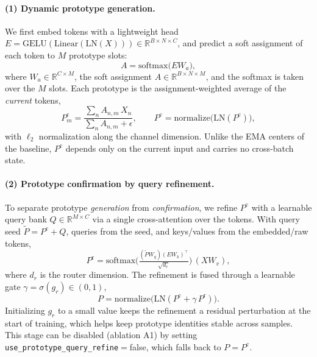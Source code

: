 \paragraph{(1) Dynamic prototype generation.}
We first embed tokens with a lightweight head
$E = \mathrm{GELU}(\mathrm{Linear}(\mathrm{LN}(X)))\in\mathbb{R}^{B\times N\times C}$,
and predict a soft assignment of each token to $M$ prototype slots:
\begin{equation}
A = \mathrm{softmax}\big(E W_a\big),
\label{eq:assign}
\end{equation}
where $W_a\in\mathbb{R}^{C\times M}$, the soft assignment
$A\in\mathbb{R}^{B\times N\times M}$, and the softmax is taken over the $M$ slots. Each prototype is the
assignment-weighted average of the \emph{current} tokens,
\begin{equation}
P^{\mathrm{c}}_{m} = \frac{\sum_{n} A_{n,m}\, X_{n}}{\sum_{n} A_{n,m} + \epsilon},
\qquad
P^{\mathrm{c}} = \mathrm{normalize}\big(\mathrm{LN}(P^{\mathrm{c}})\big),
\label{eq:proto_content}
\end{equation}
with $\ell_2$ normalization along the channel dimension. Unlike the EMA centers of
the baseline, $P^{\mathrm{c}}$ depends only on the current input and carries no
cross-batch state.

\paragraph{(2) Prototype confirmation by query refinement.}
To separate prototype \emph{generation} from \emph{confirmation}, we refine
$P^{\mathrm{c}}$ with a learnable query bank
$Q\in\mathbb{R}^{M\times C}$ via a single cross-attention over the tokens. With
query seed $\tilde{P}=P^{\mathrm{c}}+Q$, queries from the seed, and keys/values
from the embedded/raw tokens,
\begin{equation}
P^{\mathrm{r}} = \mathrm{softmax}\!\Big(\tfrac{(\tilde{P}W_q)(E W_k)^{\!\top}}
{\sqrt{d_r}}\Big)\,(X W_v),
\end{equation}
where $d_r$ is the router dimension. The refinement is fused through a learnable
gate $\gamma=\sigma(g_r)\in(0,1)$,
\begin{equation}
P = \mathrm{normalize}\big(\mathrm{LN}(P^{\mathrm{c}} + \gamma\,P^{\mathrm{r}})\big).
\label{eq:proto_refine}
\end{equation}
Initializing $g_r$ to a small value keeps the refinement a residual perturbation at
the start of training, which helps keep prototype identities stable across samples.
This stage can be disabled (ablation A1) by setting
\texttt{use\_prototype\_query\_refine}$=$false, which falls back to
$P=P^{\mathrm{c}}$.

